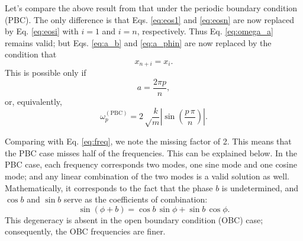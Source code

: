 \documentclass[12pt]{article}
\begin{document}
Let's compare the above result from that under the periodic boundary condition (PBC).
%
The only difference is that Eqs. \eqref{eq:eos1} and \eqref{eq:eosn}
are now replaced by Eq. \eqref{eq:eosi}
with $i = 1$ and $i = n$, respectively.
%
Thus Eq. \eqref{eq:omega_a} remains valid;
but Eqs. \eqref{eq:a_b} and \eqref{eq:a_phin}
are now replaced by the condition that
\[
  x_{n+i} = x_i.
\]
This is possible only if
\begin{equation*}
  a = \frac{ 2 \pi p } { n },
\end{equation*}
or, equivalently,
\begin{equation}
\omega_p^\mathrm{(PBC)}
=
2 \sqrt \frac k m
\left|
\sin \left( \frac {p \, \pi} {n} \right)
\right|.
\label{eq:freq_pbc}
\end{equation}



Comparing with Eq. \eqref{eq:freq},
we note the missing factor of 2.
%
This means that the PBC case misses
half of the frequencies.
%
This can be explained below.
%
In the PBC case,
each frequency corresponds
two modes, one sine mode and one cosine mode;
and any linear combination of the two modes
is a valid solution as well.
%
Mathematically, it corresponds to the fact that
the phase $b$ is undetermined,
and $\cos b$ and $\sin b$ serve as the coefficients of combination:
\[
  \sin(\phi + b) = \cos b \, \sin \phi + \sin b \, \cos \phi.
\]
This degeneracy is absent in the open boundary condition (OBC) case;
consequently, the OBC frequencies are finer.
\end{document}
